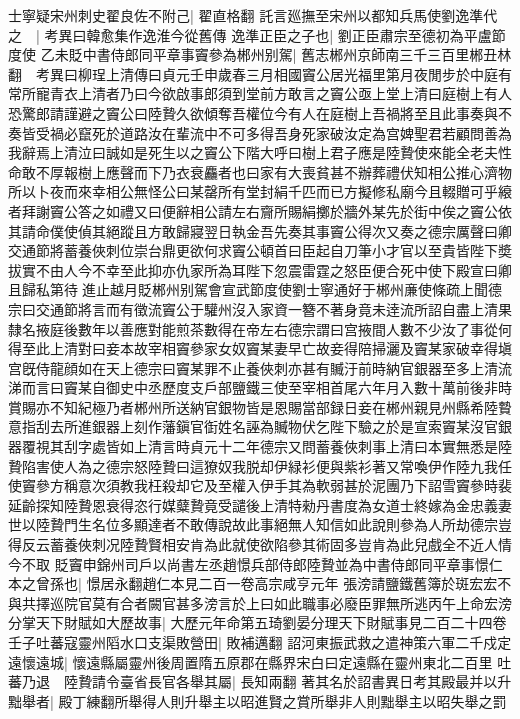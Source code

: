 士寧疑宋州刺史翟良佐不附己|{
	翟直格翻}
託言廵撫至宋州以都知兵馬使劉逸準代之　|{
	考異曰韓愈集作逸淮今從舊傳}
逸準正臣之子也|{
	劉正臣肅宗至德初為平盧節度使}
乙未貶中書侍郎同平章事竇參為郴州别駕|{
	舊志郴州京師南三千三百里郴丑林翻　考異曰柳珵上清傳曰貞元壬申歲春三月相國竇公居光福里第月夜閒步於中庭有常所寵青衣上清者乃曰今欲啟事郎須到堂前方敢言之竇公亟上堂上清曰庭樹上有人恐驚郎請謹避之竇公曰陸贄久欲傾奪吾權位今有人在庭樹上吾禍將至且此事奏與不奏皆受禍必竄死於道路汝在輩流中不可多得吾身死家破汝定為宫婢聖君若顧問善為我辭焉上清泣曰誠如是死生以之竇公下階大呼曰樹上君子應是陸贄使來能全老夫性命敢不厚報樹上應聲而下乃衣衰麤者也曰家有大喪貧甚不辦葬禮伏知相公推心濟物所以卜夜而來幸相公無怪公曰某罄所有堂封絹千匹而已方擬修私廟今且輟贈可乎縗者拜謝竇公答之如禮又曰便辭相公請左右齎所賜絹擲於牆外某先於街中俟之竇公依其請命僕使偵其絕蹤且方敢歸寢翌日執金吾先奏其事竇公得次又奏之德宗厲聲曰卿交通節將蓄養俠刺位崇台鼎更欲何求竇公頓首曰臣起自刀筆小才官以至貴皆陛下奬拔實不由人今不幸至此抑亦仇家所為耳陛下忽震雷霆之怒臣便合死中使下殿宣曰卿且歸私第待進止越月貶郴州别駕會宣武節度使劉士寧通好于郴州亷使條疏上聞德宗曰交通節將言而有徵流竇公于驩州沒入家資一簪不著身竟未逹流所詔自盡上清果隸名掖庭後數年以善應對能煎茶數得在帝左右德宗謂曰宫掖間人數不少汝了事從何得至此上清對曰妾本故宰相竇參家女奴竇某妻早亡故妾得陪掃灑及竇某家破幸得塡宫旣侍龍顔如在天上德宗曰竇某罪不止養俠刺亦甚有贓汙前時納官銀器至多上清流涕而言曰竇某自御史中丞歷度支戶部鹽鐵三使至宰相首尾六年月入數十萬前後非時賞賜亦不知紀極乃者郴州所送納官銀物皆是恩賜當部録日妾在郴州親見州縣希陸䞇意指刮去所進銀器上刻作藩鎭官衘姓名誣為贓物伏乞陛下驗之於是宣索竇某沒官銀器覆視其刮字處皆如上清言時貞元十二年德宗又問蓄養俠刺事上清曰本實無悉是陸贄陷害使人為之德宗怒陸贄曰這獠奴我脱却伊緑衫便與紫衫著又常喚伊作陸九我任使竇參方稱意次須教我枉殺却它及至權入伊手其為軟弱甚於泥團乃下詔雪竇參時裴延齡探知陸贄恩衰得恣行媒糵贄竟受譴後上清特勑丹書度為女道士終嫁為金忠義妻世以陸贄門生名位多顯達者不敢傳說故此事絕無人知信如此說則參為人所劫德宗豈得反云蓄養俠刺况陸贄賢相安肯為此就使欲陷參其術固多豈肯為此兒戲全不近人情今不取}
貶竇申錦州司戶以尚書左丞趙憬兵部侍郎陸贄並為中書侍郎同平章事憬仁本之曾孫也|{
	憬居永翻趙仁本見二百一卷高宗咸亨元年}
張滂請鹽鐵舊簿於斑宏宏不與共擇巡院官莫有合者闕官甚多滂言於上曰如此職事必廢臣罪無所逃丙午上命宏滂分掌天下財賦如大歷故事|{
	大歷元年命第五琦劉晏分理天下財賦事見二百二十四卷}
壬子吐蕃寇靈州䧟水口支渠敗營田|{
	敗補邁翻}
詔河東振武救之遣神策六軍二千戍定遠懷遠城|{
	懷遠縣屬靈州後周置隋五原郡在縣界宋白曰定遠縣在靈州東北二百里}
吐蕃乃退　陸贄請令臺省長官各舉其屬|{
	長知兩翻}
著其名於詔書異日考其殿最并以升黜舉者|{
	殿丁練翻所舉得人則升舉主以昭進賢之賞所舉非人則黜舉主以昭失舉之罰}
